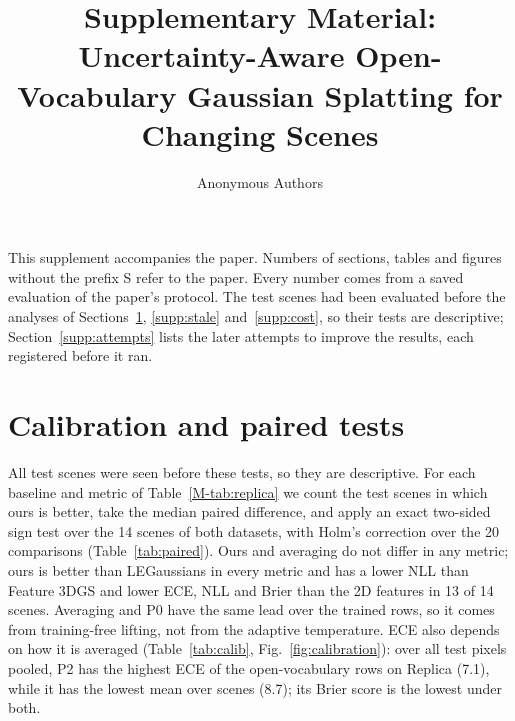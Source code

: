 \documentclass[journal]{IEEEtran}
\title{Supplementary Material:\\ Uncertainty-Aware Open-Vocabulary Gaussian Splatting for Changing Scenes}
\author{Anonymous Authors}
\begin{document}
\maketitle
\renewcommand{\thesection}{S\arabic{section}}
\renewcommand{\thetable}{S\arabic{table}}
\renewcommand{\thefigure}{S\arabic{figure}}

This supplement accompanies the paper. Numbers of sections, tables and figures without the prefix S refer to the paper. Every number comes from a saved evaluation of the paper's protocol. The test scenes had been evaluated before the analyses of Sections~\ref{supp:stats}, \ref{supp:stale} and~\ref{supp:cost}, so their tests are descriptive; Section~\ref{supp:attempts} lists the later attempts to improve the results, each registered before it ran.

\section{Calibration and paired tests}
\label{supp:stats}
All test scenes were seen before these tests, so they are descriptive. For each baseline and metric of Table~\ref{M-tab:replica} we count the test scenes in which ours is better, take the median paired difference, and apply an exact two-sided sign test over the 14 scenes of both datasets, with Holm's correction over the 20 comparisons (Table~\ref{tab:paired}). Ours and averaging do not differ in any metric; ours is better than LEGaussians in every metric and has a lower NLL than Feature 3DGS and lower ECE, NLL and Brier than the 2D features in 13 of 14 scenes. Averaging and P0 have the same lead over the trained rows, so it comes from training-free lifting, not from the adaptive temperature. ECE also depends on how it is averaged (Table~\ref{tab:calib}, Fig.~\ref{fig:calibration}): over all test pixels pooled, P2 has the highest ECE of the open-vocabulary rows on Replica (7.1), while it has the lowest mean over scenes (8.7); its Brier score is the lowest under both.
\end{document}
